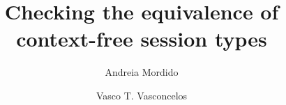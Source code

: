 \documentclass[a4paper,UKenglish,cleveref,autoref]{lipics-v2019}
\title{Checking  the equivalence of context-free session types}
\author{Andreia Mordido}{LASIGE, Faculdade de Ciências, Universidade de Lisboa, Portugal}{afmordido@fc.ul.pt}{[funding]}{}
\author{Vasco T. Vasconcelos}{LASIGE, Faculdade de Ciências, Universidade de Lisboa, Portugal}{vmvasconcelos@fc.ul.pt}{[funding]}{}
\begin{document}
\maketitle











\label{sect:bib}



%
\end{document}
